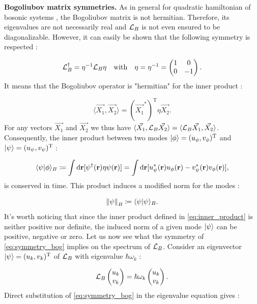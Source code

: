 \bigskip

\textbf{Bogoliubov matrix symmetries.} As in general for quadratic hamiltonian of bosonic systems \cite{castin_bose-einstein_2001}, the Bogoliubov matrix is not hermitian. Therefore, its eigenvalues are not 
necessarily real and $\mathcal{L}_B$ is not even ensured to be diagonalizable. However, it can easily be shown that the following symmetry is respected :

\begin{equation}
    \Lbog^\dagger = \eta^{-1} \Lbog \eta \ \ \ \mathrm{with} \ \ \ \eta = \eta^{-1} =\begin{pmatrix}
        1 & 0 \\
        0 & -1
    \end{pmatrix}.
    \label{eq:symmetry_bog}
\end{equation}
It means that the Bogoliubov operator is "hermitian" for the inner product :

\begin{equation}
    \langle \vec{X_1},\vec{X_2} \rangle = (\vec{X_1}^*)^{\mathrm{T}} \eta \vec{X_2}.
    \label{eq:inner_product}
\end{equation}
For any vectors $\vec{X_1}$ and $\vec{X_2}$ we thus have $\langle \vec{X_1},\mathcal{L}_B\vec{X_2} \rangle = \langle \mathcal{L}_B\vec{X_1},\vec{X_2} \rangle$. 
Consequently, the inner product between two modes $\ket{\phi}= (u_{\phi}, v_{\phi})^\mathrm{T}$ and $\ket{\psi}=(u_{\psi}, v_{\psi})^\mathrm{T}$ :

\begin{equation}
    \langle \psi| \phi \rangle_B \coloneqq \int \mathrm{d}\mathbf{r}[\psi^\dagger(\mathbf{r})\eta\psi(\mathbf{r})] = \int \mathrm{d}\mathbf{r}[u_{\psi}^*(\mathbf{r})u_{\phi}(\mathbf{r})-v_{\psi}^*(\mathbf{r})v_{\phi}(\mathbf{r})],
    \label{eq:inner_product}
\end{equation}
is conserved in time. This product induces a modified norm for the modes : 

\begin{equation}
    \norm{\psi}_{B}\coloneqq \langle \psi| \psi \rangle_B.
    \label{eq:modified_norm}
\end{equation}
It's worth noticing that since the inner product defined in \autoref{eq:inner_product} is neither positive nor definite, the induced norm of a given mode $\ket{\psi}$
can be positive, negative or zero. Let us now see what the symmetry of \autoref{eq:symmetry_bog} implies on the spectrum of $\mathcal{L}_B$. Consider an eigenvector $\ket{\psi}= (u_k,v_k)^\mathrm{T}$ of $\mathcal{L}_B$ with eigenvalue $\hbar\omega_k$ : 

\begin{equation}
    \mathcal{L}_B \begin{pmatrix}
        u_k \\
        v_k
    \end{pmatrix} = \hbar\omega_k \begin{pmatrix}
        u_k \\
        v_k
    \end{pmatrix}.
\end{equation}
Direct substitution of \autoref{eq:symmetry_bog} in the eigenvalue equation gives :

